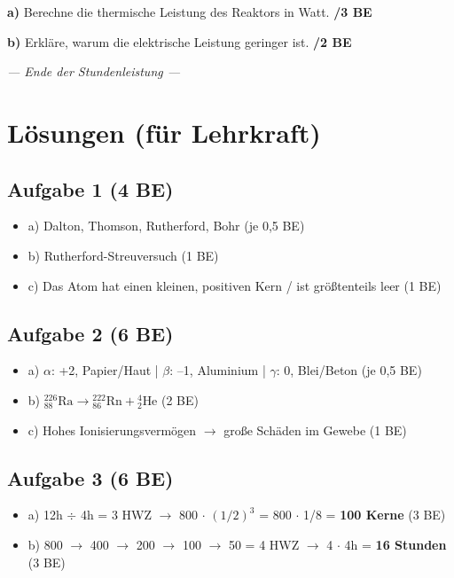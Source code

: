 \documentclass[11pt,a4paper]{article}
\newcommand{\punkte}[1]{\hfill\textbf{/#1 BE}}
\newcommand{\antwortfeld}[1]{\vspace{#1}\hrulefill\par\vspace{0.2cm}\hrulefill\par\vspace{0.2cm}\hrulefill\par}
\begin{document}
\textbf{a)} Berechne die thermische Leistung des Reaktors in Watt. \punkte{3}

\antwortfeld{2cm}

\textbf{b)} Erkläre, warum die elektrische Leistung geringer ist. \punkte{2}

\antwortfeld{1cm}

\vspace{0.5cm}

\begin{center}
\textit{--- Ende der Stundenleistung ---}
\end{center}

\newpage

\section*{Lösungen (für Lehrkraft)}

\subsection*{Aufgabe 1 (4 BE)}
\begin{itemize}
    \item a) Dalton, Thomson, Rutherford, Bohr (je 0,5 BE)
    \item b) Rutherford-Streuversuch (1 BE)
    \item c) Das Atom hat einen kleinen, positiven Kern / ist größtenteils leer (1 BE)
\end{itemize}

\subsection*{Aufgabe 2 (6 BE)}
\begin{itemize}
    \item a) $\alpha$: +2, Papier/Haut | $\beta$: --1, Aluminium | $\gamma$: 0, Blei/Beton (je 0,5 BE)
    \item b) ${}^{226}_{88}\text{Ra} \rightarrow {}^{222}_{86}\text{Rn} + {}^{4}_{2}\text{He}$ (2 BE)
    \item c) Hohes Ionisierungsvermögen $\rightarrow$ große Schäden im Gewebe (1 BE)
\end{itemize}

\subsection*{Aufgabe 3 (6 BE)}
\begin{itemize}
    \item a) 12h $\div$ 4h = 3 HWZ $\rightarrow$ 800 $\cdot$ $(1/2)^3$ = 800 $\cdot$ 1/8 = \textbf{100 Kerne} (3 BE)
    \item b) 800 $\rightarrow$ 400 $\rightarrow$ 200 $\rightarrow$ 100 $\rightarrow$ 50 = 4 HWZ $\rightarrow$ 4 $\cdot$ 4h = \textbf{16 Stunden} (3 BE)
\end{itemize}
\end{document}
